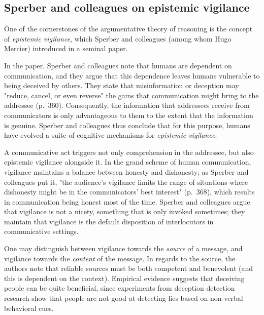 \subsection{Sperber and colleagues on epistemic vigilance}
\label{sec:Sperber10}


One of the cornerstones of the argumentative theory of reasoning is the concept of \emph{epistemic vigilance}, which Sperber and colleagues (among whom Hugo Mercier) introduced in a seminal \citeyear{Sperber10} paper.

In the paper, Sperber and colleagues note that humans are dependent on communication, and they argue that this dependence leaves humans vulnerable to being deceived by others.
They state that misinformation or deception may "reduce, cancel, or even reverse" the gains that communication might bring to the addressee (p.~360).
Consequently, the information that addressees receive from communicators is only advantageous to them to the extent that the information is genuine.
Sperber and colleagues thus conclude that for this purpose, humans have evolved a suite of cognitive mechanisms for \emph{epistemic vigilance}.

A communicative act triggers not only comprehension in the addressee, but also epistemic vigilance alongside it.
In the grand scheme of human communication, vigilance maintains a balance between honesty and dishonesty; as Sperber and colleagues put it, "the audience's vigilance limits the range of situations where dishonesty might be in the communicators' best interest" (p.~368), which results in communication being honest most of the time.
Sperber and colleagues argue that vigilance is not a nicety, something that is only invoked sometimes; they maintain that vigilance is the default disposition of interlocutors in communicative settings.

One may distinguish between vigilance towards the \emph{source} of a message, and vigilance towards the \emph{content} of the message.
In regards to the source, the authors note that reliable sources must be both competent and benevolent (and this is dependent on the context).
Empirical evidence suggests that deceiving people can be quite beneficial, since experiments from deception detection research show that people are not good at detecting lies based on non-verbal behavioral cues.



